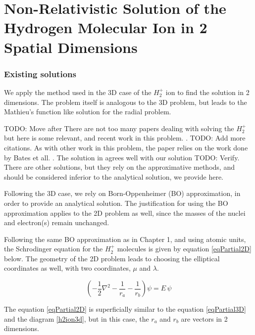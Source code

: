 \chapter{Non-Relativistic Solution of the Hydrogen Molecular Ion in 2 Spatial Dimensions}

\subsection{Existing solutions}

We apply the method used in the 3D case of the $ H_2^{+} $ ion to find the solution in 2 dimensions. The problem itself is analogous to the 3D problem, but leads to the Mathieu's function like solution for the radial problem.

TODO: Move after
There are not too many papers dealing with solving the $ H_2^{+} $ but here is some relevant, and recent work in this problem. \cite{H2Plus2d1}. TODO: Add more citations.  As with other work in this problem, the paper relies on the work done by Bates et all. \cite{Bates1}. The solution in \cite{H2Plus2d1} agrees well with our solution TODO: Verify. There are other solutions, but they rely on the approximative methods, and should be considered inferior to the analytical solution, we provide here. 

Following the 3D case, we rely on Born-Oppenheimer (BO) approximation, in order to provide an analytical solution. The justification for using the BO approximation applies to the 2D problem as well, since the masses of the nuclei and electron(s) remain unchanged.

Following the same BO approximation as in Chapter 1, and using atomic units, the Schrodinger equation for the $ H_2^{+} $ molecules is given by equation \eqref{eqPartial2D} below. The geometry of the 2D problem leads to choosing the elliptical coordinates as well, with two coordinates, $ \mu $ and $ \lambda $.

\begin{equation}\label{eqPartial2D}
\left(-\frac{1}{2}\nabla^2-\frac{1}{r_a}-\frac{1}{r_b}\right)\psi = E\,\psi
\end{equation}

The equation \eqref{eqPartial2D} is superficially similar to the equation \eqref{eqPartial3D} and the diagram \ref{h2ion3d}, but in this case, the $ r_a $ and $ r_b $ are vectors in 2 dimensions.

